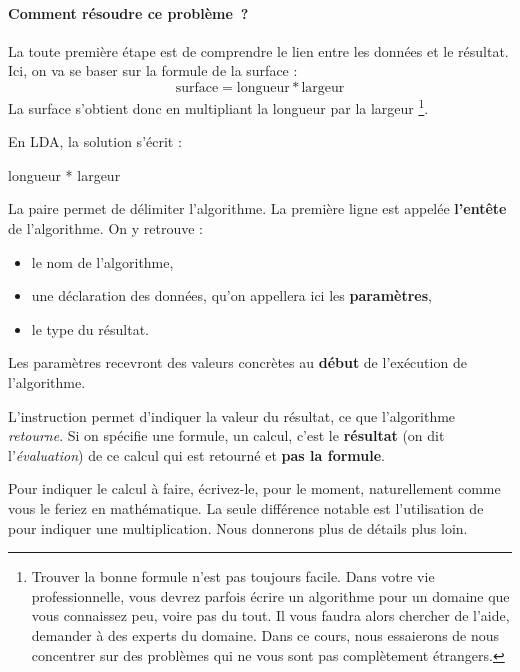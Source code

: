 			\paragraph{Comment résoudre ce problème~?} 
			La toute première étape est de comprendre 
			le lien entre les données et le résultat. 
			Ici, on va se baser sur la formule de la surface :
			\[
				\textrm{surface} = \textrm{longueur} * \textrm{largeur}
			\]
			La surface s’obtient donc en multipliant la longueur par la largeur%
			\footnote{%
				Trouver la bonne formule n’est pas toujours facile.
				Dans votre vie professionnelle, 
				vous devrez parfois écrire un algorithme
				pour un domaine que vous connaissez peu,
				voire pas du tout.
				Il vous faudra alors chercher de l’aide,
				demander à des experts du domaine.
				Dans ce cours,
				nous essaierons de nous concentrer sur des problèmes
				qui ne vous sont pas complètement étrangers.
			}.
			
			En LDA, la solution s’écrit :
			
			\begin{LDA}
					\Return longueur * largeur
				\EndAlgo
			\end{LDA}
		
			La paire \lda{\algorithmicalgo-\algorithmicend\ \algorithmicalgo}
			permet de délimiter l’algorithme.
			La première ligne est appelée 
			\textbf{l’entête} de l’algorithme.
			On y retrouve :
			\begin{itemize}
				\item 
					le nom de l’algorithme,
				\item 
					une déclaration des données, 
					qu’on appellera ici les \textbf{paramètres}, 
				\item 
					le type du résultat.
			\end{itemize}
		
			Les paramètres recevront des valeurs concrètes
			au \textbf{début} de l’exécution de l’algorithme. 
		
			L’instruction \lda{\algorithmicreturn}
			permet d’indiquer la valeur du résultat, 
			ce que l’algorithme \emph{retourne}.
			Si on spécifie une formule, un calcul,
			c’est le \textbf{résultat} (on dit l’\emph{évaluation}) 
			de ce calcul qui est retourné et \textbf{pas la formule}.
		
			Pour indiquer le calcul à faire,
			écrivez-le, pour le moment,
			naturellement comme vous le feriez en mathématique.
			La seule différence notable est l’utilisation de \lda{*}
			pour indiquer une multiplication.
			Nous donnerons plus de détails plus loin.
	

